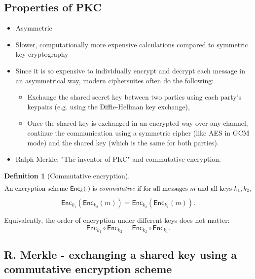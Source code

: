 \documentclass[11pt]{article}
\theoremstyle{definition}
\newtheorem{definition}{Definition}[section]
\theoremstyle{proof}
\newcommand{\Enc}{\mathsf{Enc}}
\begin{document}
	\subsection{Properties of PKC}
	
	\begin{itemize}
		\item Asymmetric
		\item Slower, computationally more expensive calculations compared to symmetric key cryptography
		\item Since it is so expensive to individually encrypt and decrypt each message in an asymmetrical way, modern ciphersuites often do the following:
		\begin{itemize}
			\item Exchange the shared secret key between two parties using each party's keypairs (e.g. using the Diffie-Hellman key exchange),
			\item Once the shared key is exchanged in an encrypted way over any channel, continue the communication using a symmetric cipher (like AES in GCM mode) and the shared key (which is the same for both parties).
		\end{itemize}
		\item Ralph Merkle: "The inventor of PKC" and commutative encryption.
	\end{itemize}
	
	\begin{definition}[Commutative encryption]
	\[
	\text{An encryption scheme } \Enc_k(\cdot) \text{ is \emph{commutative} if for all messages } m
	\text{ and all keys } k_1, k_2,
	\]
	\[
	\Enc_{k_1}(\Enc_{k_2}(m)) = \Enc_{k_2}(\Enc_{k_1}(m)).
	\]
	
	Equivalently, the order of encryption under different keys does not matter:
	\[
	\Enc_{k_1} \circ \Enc_{k_2} = \Enc_{k_2} \circ \Enc_{k_1}.
	\]
	\end{definition}
	
	\subsection{R. Merkle - exchanging a shared key using a commutative encryption scheme}
	
\end{document}
